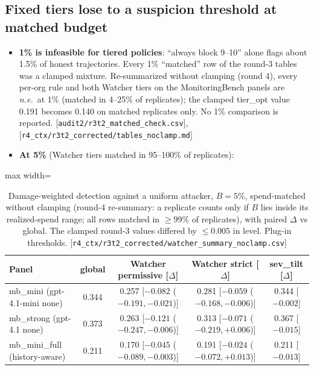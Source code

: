 \documentclass[11pt]{article}
\newcommand{\src}[1]{{\footnotesize\textcolor{ink2}{[\nolinkurl{#1}]}}}
\newcommand{\NE}{\textit{n.e.}}
\begin{document}
\subsection{Fixed tiers lose to a suspicion threshold at matched budget}
\begin{itemize}
\item \textbf{1\% is infeasible for tiered policies}: ``always block 9--10'' alone flags about 1.5\% of honest trajectories. Every 1\% ``matched'' row of the round-3 tables was a clamped mixture. Re-summarized without clamping (round 4), every per-org rule and both Watcher tiers on the MonitoringBench panels are \NE\ at 1\% (matched in 4--25\% of replicates); the clamped tier\_opt value 0.191 becomes 0.140 on matched replicates only. No 1\% comparison is reported. \src{audit2/r3t2_matched_check.csv}, \src{r4_ctx/r3t2_corrected/tables_noclamp.md}
\item \textbf{At 5\%} (Watcher tiers matched in 95--100\% of replicates):
\end{itemize}
\begin{table}[!htb]\centering\small
\begin{adjustbox}{max width=\linewidth}\begin{tabular}{@{}lcccc@{}}
\toprule
Panel & global & Watcher permissive [$\Delta$] & Watcher strict [$\Delta$] & sev\_tilt [$\Delta$]\\
\midrule
mb\_mini (gpt-4.1-mini none) & 0.344 & 0.257 [$-0.082$ ($-0.191,-0.021$)] & 0.281 [$-0.059$ ($-0.168,-0.006$)] & 0.344 [$-0.002$]\\
mb\_strong (gpt-4.1 none) & 0.373 & 0.263 [$-0.121$ ($-0.247,-0.006$)] & 0.313 [$-0.071$ ($-0.219,+0.006$)] & 0.367 [$-0.015$]\\
mb\_mini\_full (history-aware) & 0.211 & 0.170 [$-0.045$ ($-0.089,-0.003$)] & 0.191 [$-0.024$ ($-0.072,+0.013$)] & 0.211 [$-0.013$]\\
\bottomrule
\end{tabular}\end{adjustbox}
\caption{Damage-weighted detection against a uniform attacker, $B=5\%$, spend-matched without clamping (round-4 re-summary: a replicate counts only if $B$ lies inside its realized-spend range; all rows matched in $\ge99\%$ of replicates), with paired $\Delta$ vs global. The clamped round-3 values differed by $\le0.005$ in level. Plug-in thresholds. \src{r4_ctx/r3t2_corrected/watcher_summary_noclamp.csv}}
\end{table}
\end{document}
